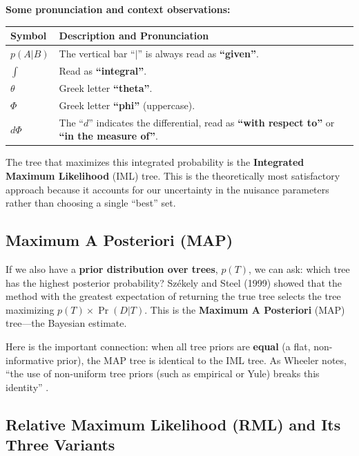 \vspace{0.5cm}

\textbf{Some pronunciation and context observations:}

\begin{center}
\renewcommand{\arraystretch}{1.5}
\begin{tabular}{lp{10cm}}
\hline
\textbf{Symbol} & \textbf{Description and Pronunciation} \\ \hline
$p(A|B)$ & The vertical bar ``$|$'' is always read as \textbf{``given''}. \\
$\int$ & Read as \textbf{``integral''}. \\
$\theta$ & Greek letter \textbf{``theta''}. \\
$\Phi$ & Greek letter \textbf{``phi''} (uppercase). \\
$d\Phi$ & The ``$d$'' indicates the differential, read as \textbf{``with respect to''} or \textbf{``in the measure of''}. \\ \hline
\end{tabular}
\end{center}

The tree that maximizes this integrated probability is the \textbf{Integrated Maximum Likelihood} (IML) tree. This is the theoretically most satisfactory approach because it accounts for our uncertainty in the nuisance parameters rather than choosing a single ``best'' set.

\subsection{Maximum A Posteriori (MAP)}

If we also have a \textbf{prior distribution over trees}, $p(T)$, we can ask: which tree has the highest posterior probability? Székely and Steel (1999) showed that the method with the greatest expectation of returning the true tree selects the tree maximizing $p(T) \times \Pr(D|T)$. This is the \textbf{Maximum A Posteriori} (MAP) tree---the Bayesian estimate.

Here is the important connection: when all tree priors are \textbf{equal} (a flat, non-informative prior), the MAP tree is identical to the IML tree. As Wheeler notes, ``the use of non-uniform tree priors (such as empirical or Yule) breaks this identity'' \parencite{wheeler2012}.

\subsection{Relative Maximum Likelihood (RML) and Its Three Variants}

